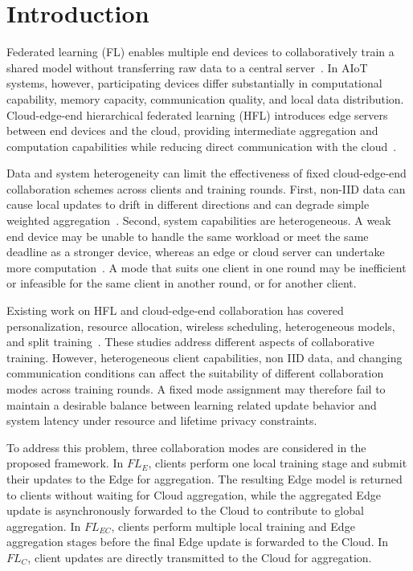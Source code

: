 \documentclass[5p,times]{elsarticle}
\theoremstyle{plain}
\theoremstyle{definition}
\theoremstyle{remark}
\begin{document}
	\section{Introduction}
	\label{sec:introduction}
	Federated learning (FL) enables multiple end devices to collaboratively train a shared model without transferring raw data to a central server~\cite{fedavg,ZHAO2026108518}. In AIoT systems, however, participating devices differ substantially in computational capability, memory capacity, communication quality, and local data distribution. Cloud-edge-end hierarchical federated learning (HFL) introduces edge servers between end devices and the cloud, providing intermediate aggregation and computation capabilities while reducing direct communication with the cloud~\cite{hfl,FLaTEC2026,yang2026hierarchical}.
	
	Data and system heterogeneity can limit the effectiveness of fixed cloud-edge-end collaboration schemes across clients and training rounds. First, non-IID data can cause
	local updates to drift in different directions and can degrade simple weighted
	aggregation~\cite{fedavgm,fedprox,scaffold,khan2026accelerating,11214447}.
	Second, system capabilities are heterogeneous. A weak end device may be unable
	to handle the same workload or meet the same deadline as a stronger device,
	whereas an edge or cloud server can undertake more computation~\cite{wang2019adaptivefl,FAN2026108249}.
	A mode that suits one client in one round may be inefficient or infeasible
	for the same client in another round, or for another client.
	
	Existing work on HFL and cloud-edge-end collaboration has covered personalization,
	resource allocation, wireless scheduling, heterogeneous models, and split
	training~\cite{Personalizedhfl,JSJX202502007,dinh2021wirelessfl,BSBODP,mazloomi2025multiserver,SFETEC,11185336,YAO2026108495}.	
	These studies address different aspects of
	collaborative training. However, heterogeneous
	client capabilities, non IID data, and changing
	communication conditions can affect the suitability
	of different collaboration modes across training
	rounds. A fixed mode assignment may therefore
	fail to maintain a desirable balance between
	learning related update behavior and system
	latency under resource and lifetime privacy
	constraints.	
	
	To address this problem, three collaboration
	modes are considered in the proposed framework.	
	In $FL_E$, clients perform one local training
	stage and submit their updates to the Edge for
	aggregation. The resulting Edge model is
	returned to clients without waiting for Cloud
	aggregation, while the aggregated Edge update
	is asynchronously forwarded to the Cloud to
	contribute to global aggregation.
	In $FL_{EC}$, clients perform multiple local
	training and Edge aggregation stages before
	the final Edge update is forwarded to the Cloud.
	In $FL_C$, client updates are directly transmitted
	to the Cloud for aggregation.
	
\end{document}
